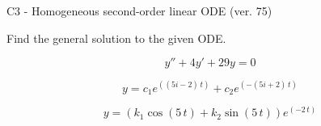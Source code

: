 \begin{exercise}
  \begin{exerciseTitle}C3 - Homogeneous second-order linear ODE (ver. 75)\end{exerciseTitle}
  \begin{exerciseStatement}
    
Find the general solution to the given ODE.

    
\[y''+4y'+29y = 0\]

  \end{exerciseStatement}
  \begin{exerciseAnswer}
    
\[y= c_{1} e^{\left(\left(5 i - 2\right) \, t\right)} + c_{2} e^{\left(-\left(5 i + 2\right) \, t\right)}\]

    
\[y= {\left(k_{1} \cos\left(5 \, t\right) + k_{2} \sin\left(5 \, t\right)\right)} e^{\left(-2 \, t\right)}\]

  \end{exerciseAnswer}
\end{exercise}